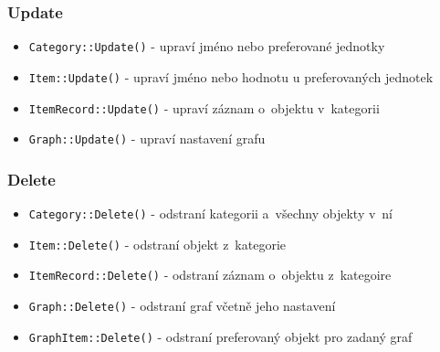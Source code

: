 \documentclass[12pt, titlepage]{article}
\begin{document}
	\subsubsection{Update}
\begin{itemize}
	\item \texttt{Category::Update()} - upraví jméno nebo preferované jednotky
	\item \texttt{Item::Update()} - upraví jméno nebo hodnotu u preferovaných jednotek
	\item \texttt{ItemRecord::Update()} - upraví záznam o~objektu v~kategorii
	\item \texttt{Graph::Update()} - upraví nastavení grafu
\end{itemize}

	\subsubsection{Delete}
\begin{itemize}
	\item \texttt{Category::Delete()} - odstraní kategorii a~všechny objekty v~ní
	\item \texttt{Item::Delete()} - odstraní objekt z~kategorie
	\item \texttt{ItemRecord::Delete()} - odstraní záznam o~objektu z~kategoire
	\item \texttt{Graph::Delete()} - odstraní graf včetně jeho nastavení
	\item \texttt{GraphItem::Delete()} - odstraní preferovaný objekt pro zadaný graf
\end{itemize}
\end{document}
